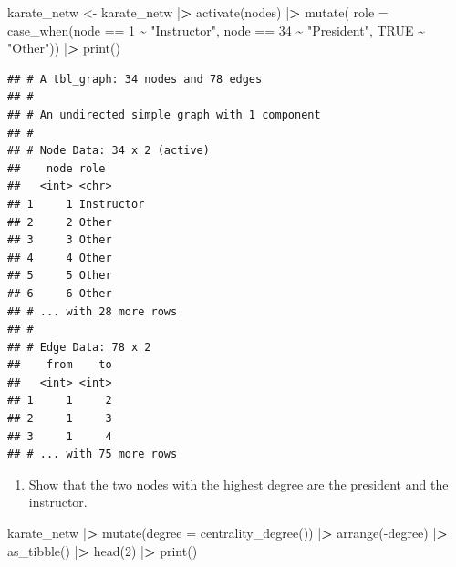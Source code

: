 \documentclass[
]{article}
\newenvironment{Shaded}{\begin{snugshade}}{\end{snugshade}}
\newcommand{\AttributeTok}[1]{\textcolor[rgb]{0.77,0.63,0.00}{#1}}
\newcommand{\ConstantTok}[1]{\textcolor[rgb]{0.00,0.00,0.00}{#1}}
\newcommand{\DecValTok}[1]{\textcolor[rgb]{0.00,0.00,0.81}{#1}}
\newcommand{\ErrorTok}[1]{\textcolor[rgb]{0.64,0.00,0.00}{\textbf{#1}}}
\newcommand{\FunctionTok}[1]{\textcolor[rgb]{0.00,0.00,0.00}{#1}}
\newcommand{\NormalTok}[1]{#1}
\newcommand{\OtherTok}[1]{\textcolor[rgb]{0.56,0.35,0.01}{#1}}
\newcommand{\SpecialCharTok}[1]{\textcolor[rgb]{0.00,0.00,0.00}{#1}}
\newcommand{\StringTok}[1]{\textcolor[rgb]{0.31,0.60,0.02}{#1}}
\providecommand{\tightlist}{%
  \setlength{\itemsep}{0pt}\setlength{\parskip}{0pt}}
\begin{document}
\begin{Shaded}
\begin{Highlighting}[]
\NormalTok{karate\_netw }\OtherTok{\textless{}{-}}\NormalTok{ karate\_netw }\SpecialCharTok{|}\ErrorTok{\textgreater{}}
  \FunctionTok{activate}\NormalTok{(nodes) }\SpecialCharTok{|}\ErrorTok{\textgreater{}}
  \FunctionTok{mutate}\NormalTok{(}
    \AttributeTok{role =} \FunctionTok{case\_when}\NormalTok{(node }\SpecialCharTok{==} \DecValTok{1} \SpecialCharTok{\textasciitilde{}} \StringTok{"Instructor"}\NormalTok{,}
\NormalTok{                     node }\SpecialCharTok{==} \DecValTok{34} \SpecialCharTok{\textasciitilde{}} \StringTok{"President"}\NormalTok{,}
                     \ConstantTok{TRUE} \SpecialCharTok{\textasciitilde{}} \StringTok{"Other"}\NormalTok{)) }\SpecialCharTok{|}\ErrorTok{\textgreater{}}
  \FunctionTok{print}\NormalTok{()}
\end{Highlighting}
\end{Shaded}

\begin{verbatim}
## # A tbl_graph: 34 nodes and 78 edges
## #
## # An undirected simple graph with 1 component
## #
## # Node Data: 34 x 2 (active)
##    node role      
##   <int> <chr>     
## 1     1 Instructor
## 2     2 Other     
## 3     3 Other     
## 4     4 Other     
## 5     5 Other     
## 6     6 Other     
## # ... with 28 more rows
## #
## # Edge Data: 78 x 2
##    from    to
##   <int> <int>
## 1     1     2
## 2     1     3
## 3     1     4
## # ... with 75 more rows
\end{verbatim}

\begin{enumerate}
\def\labelenumi{(\arabic{enumi})}
\setcounter{enumi}{4}
\tightlist
\item
  Show that the two nodes with the highest degree are the president and
  the instructor.
\end{enumerate}

\begin{Shaded}
\begin{Highlighting}[]
\NormalTok{karate\_netw }\SpecialCharTok{|}\ErrorTok{\textgreater{}}
  \FunctionTok{mutate}\NormalTok{(}\AttributeTok{degree =} \FunctionTok{centrality\_degree}\NormalTok{()) }\SpecialCharTok{|}\ErrorTok{\textgreater{}}
  \FunctionTok{arrange}\NormalTok{(}\SpecialCharTok{{-}}\NormalTok{degree) }\SpecialCharTok{|}\ErrorTok{\textgreater{}}
  \FunctionTok{as\_tibble}\NormalTok{() }\SpecialCharTok{|}\ErrorTok{\textgreater{}}
  \FunctionTok{head}\NormalTok{(}\DecValTok{2}\NormalTok{) }\SpecialCharTok{|}\ErrorTok{\textgreater{}}
  \FunctionTok{print}\NormalTok{()}
\end{Highlighting}
\end{Shaded}
\end{document}
